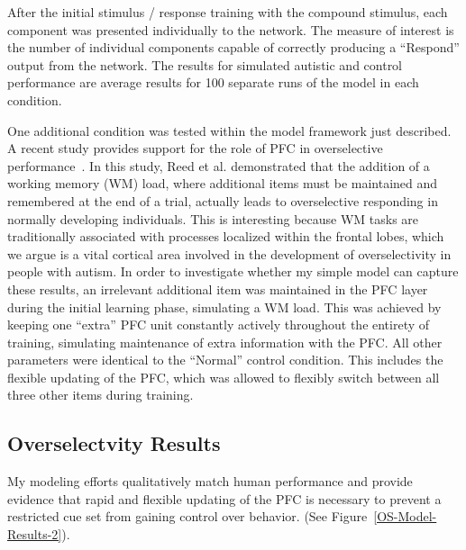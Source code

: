 \documentclass[man]{apa}
\begin{document}
After the initial stimulus / response training with the compound stimulus, each component was presented individually to the network.  The measure of interest is the number of individual components capable of correctly producing a ``Respond'' output from the network.  The results for simulated autistic and control performance are average results for 100 separate runs of the model in each condition.

One additional condition was tested within the model framework just described.  A recent study provides support for the role of PFC in overselective performance~\cite{RefWorks:112}.  In this study, Reed et al. demonstrated that the addition of a working memory (WM) load, where additional items must be maintained and remembered at the end of a trial, actually leads to overselective responding in normally developing individuals.  This is interesting because WM tasks are traditionally associated with processes localized within the frontal lobes, which we argue is a vital cortical area involved in the development of overselectivity in people with autism.  In order to investigate whether my simple model can capture these results, an irrelevant additional item was maintained in the PFC layer during the initial learning phase, simulating a WM load.  This was achieved by keeping one ``extra'' PFC unit constantly actively throughout the entirety of training, simulating maintenance of extra information with the PFC.  All other parameters were identical to the ``Normal'' control condition.  This includes the flexible updating of the PFC, which  was allowed to flexibly switch between all three other items during training.


\subsection{Overselectvity Results}
My modeling efforts qualitatively match human performance and provide evidence that rapid and flexible updating of the PFC is necessary to prevent a restricted cue set from gaining control over behavior. (See Figure~\ref{OS-Model-Results-2}).  
\end{document}
